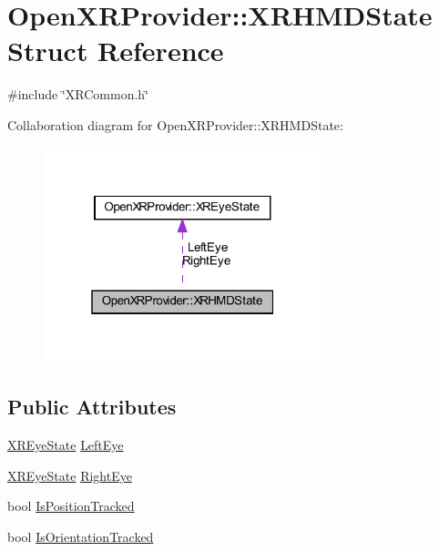 \hypertarget{struct_open_x_r_provider_1_1_x_r_h_m_d_state}{}\section{Open\+X\+R\+Provider\+::X\+R\+H\+M\+D\+State Struct Reference}
\label{struct_open_x_r_provider_1_1_x_r_h_m_d_state}


{\ttfamily \#include \char`\"{}X\+R\+Common.\+h\char`\"{}}



Collaboration diagram for Open\+X\+R\+Provider\+::X\+R\+H\+M\+D\+State\+:\nopagebreak
\begin{figure}[H]
\begin{center}
\leavevmode
\includegraphics[width=229pt]{struct_open_x_r_provider_1_1_x_r_h_m_d_state__coll__graph}
\end{center}
\end{figure}
\subsection*{Public Attributes}
\begin{DoxyCompactItemize}
\item 
\mbox{\hyperlink{struct_open_x_r_provider_1_1_x_r_eye_state}{X\+R\+Eye\+State}} \mbox{\hyperlink{struct_open_x_r_provider_1_1_x_r_h_m_d_state_a601339a681e20dd9047e6d63da3a22fa}{Left\+Eye}}
\item 
\mbox{\hyperlink{struct_open_x_r_provider_1_1_x_r_eye_state}{X\+R\+Eye\+State}} \mbox{\hyperlink{struct_open_x_r_provider_1_1_x_r_h_m_d_state_a72e6afc6875efdf77079f615b0e833d3}{Right\+Eye}}
\item 
bool \mbox{\hyperlink{struct_open_x_r_provider_1_1_x_r_h_m_d_state_a46d3bdea018d488ffb535553d58594dc}{Is\+Position\+Tracked}}
\item 
bool \mbox{\hyperlink{struct_open_x_r_provider_1_1_x_r_h_m_d_state_ac03cf1cf415a74e7918aad821440040e}{Is\+Orientation\+Tracked}}
\end{DoxyCompactItemize}



